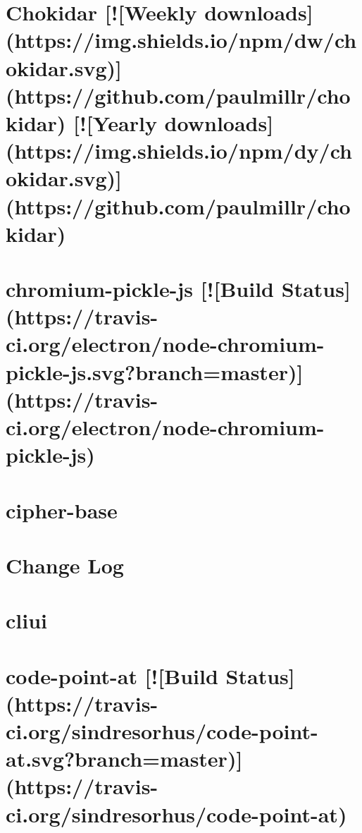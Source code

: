 \documentclass[twoside]{book}
\newcommand{\+}{\discretionary{\mbox{\scriptsize$\hookleftarrow$}}{}{}}
\begin{document}
\chapter{Chokidar \mbox{[}!\mbox{[}Weekly downloads\mbox{]}(https\+://img.shields.\+io/npm/dw/chokidar.svg)\mbox{]}(https\+://github.com/paulmillr/chokidar) \mbox{[}!\mbox{[}Yearly downloads\mbox{]}(https\+://img.shields.\+io/npm/dy/chokidar.svg)\mbox{]}(https\+://github.com/paulmillr/chokidar)}
\label{md_dsmacc_examples_DRmerge_node_modules_chokidar_README}

\chapter{chromium-\/pickle-\/js \mbox{[}!\mbox{[}Build Status\mbox{]}(https\+://travis-\/ci.org/electron/node-\/chromium-\/pickle-\/js.svg?branch=master)\mbox{]}(https\+://travis-\/ci.org/electron/node-\/chromium-\/pickle-\/js)}
\label{md_dsmacc_examples_DRmerge_node_modules_chromium-pickle-js_README}

\chapter{cipher-\/base}
\label{md_dsmacc_examples_DRmerge_node_modules_cipher-base_README}

\chapter{Change Log}
\label{md_dsmacc_examples_DRmerge_node_modules_cliui_CHANGELOG}

\chapter{cliui}
\label{md_dsmacc_examples_DRmerge_node_modules_cliui_README}

\chapter{code-\/point-\/at \mbox{[}!\mbox{[}Build Status\mbox{]}(https\+://travis-\/ci.org/sindresorhus/code-\/point-\/at.svg?branch=master)\mbox{]}(https\+://travis-\/ci.org/sindresorhus/code-\/point-\/at)}
\label{md_dsmacc_examples_DRmerge_node_modules_code-point-at_readme}

\end{document}
